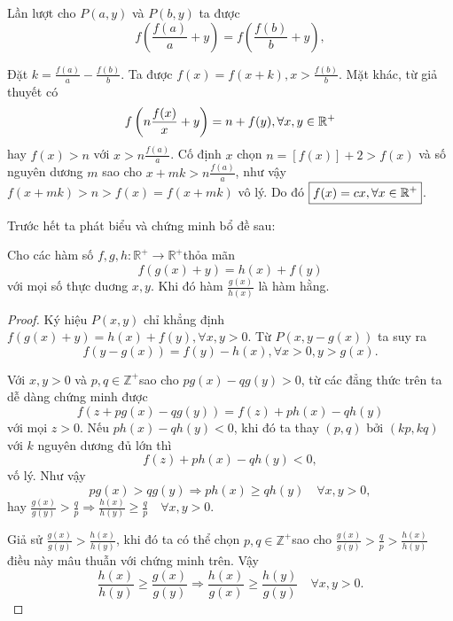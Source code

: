 \documentclass[11pt]{scrartcl}
\begin{document}
\begin{itemize}[label=, leftmargin=0em, itemsep=0.5em]
\begin{sol}
        Lần lượt cho $P(a,y)$ và $P(b,y)$ ta được \[f\left(\frac{f(a)}{a} + y\right) = f\left(\frac{f(b)}{b} + y\right),\tag{2}\]

        Đặt $k = \frac{f(a)}{a} - \frac{f(b)}{b}$. Ta được $f(x) = f(x + k), x > \frac{f(b)}{b}$. Mặt khác, từ giả thuyết có 
        \[
            f\left(n\frac{f(x)}{x} + y\right) = n + f(y), \xyro
        \]
        hay $f(x) > n$ với $x > n\frac{f(a)}{a}$. Cố định $x$ chọn $n = [f(x)] + 2 > f(x)$ và số nguyên dương $m$ sao cho $x + mk  > n\frac{f(a)}{a}$, như vậy $f(x + mk)  > n > f(x) = f(x + mk)$ vô lý. Do đó $\boxed{f(x) = cx, \forall x\in \mathbb{R^+}}$.

         Trước hết ta phát biểu và chứng minh bổ đề sau:
        \begin{lemma}
            Cho các hàm số $f, g, h: \mathbb{R}^{+} \rightarrow \mathbb{R}^{+}$thỏa mãn
            $$
            f(g(x)+y)=h(x)+f(y)
            $$
            với mọi số thực duơng $x, y$. Khi đó hàm $\frac{g(x)}{h(x)}$ là hàm hằng.
        \end{lemma}
        \begin{proof}
            Ký hiệu $P(x, y)$ chỉ khẳng định $f(g(x)+y)=h(x)+f(y), \forall x, y>0$. Từ $P(x, y-g(x))$ ta suy ra
                $$
                f(y-g(x))=f(y)-h(x), \forall x>0, y>g(x) .
                $$

                Với $x, y>0$ và $p, q \in \mathbb{Z}^{+}$sao cho $p g(x)-q g(y)>0$, từ các đẳng thức trên ta dễ dàng chứng minh được
                $$
                f(z+p g(x)-q g(y))=f(z)+p h(x)-q h(y)
                $$
                với mọi $z>0$. Nếu $p h(x)-q h(y)<0$, khi đó ta thay $(p, q)$ bởi $(k p, k q)$ với $k$ nguyên dương đủ lớn thì
                $$
                f(z)+p h(x)-q h(y)<0,
                $$
                vố lý. Như vậy
                $$
                p g(x)>q g(y) \Longrightarrow p h(x) \geq q h(y) \quad \forall x, y>0,
                $$
                hay
                $
                \frac{g(x)}{g(y)}>\frac{q}{p} \Longrightarrow \frac{h(x)}{h(y)} \geq \frac{q}{p} \quad \forall x, y>0 .
                $

                Giả sử $\frac{g(x)}{g(y)}>\frac{h(x)}{h(y)}$, khi đó ta có thể chọn $p, q \in \mathbb{Z}^{+}$sao cho
                $ 
                \frac{g(x)}{g(y)}>\frac{q}{p}>\frac{h(x)}{h(y)}
                $
                điều này mâu thuẫn với chứng minh trên. Vậy
                $$
                \frac{h(x)}{h(y)} \geq \frac{g(x)}{g(y)} \Longrightarrow \frac{h(x)}{g(x)} \geq \frac{h(y)}{g(y)} \quad \forall x, y>0 .
                $$


\end{proof}
\end{sol}
\end{itemize}
\end{document}
